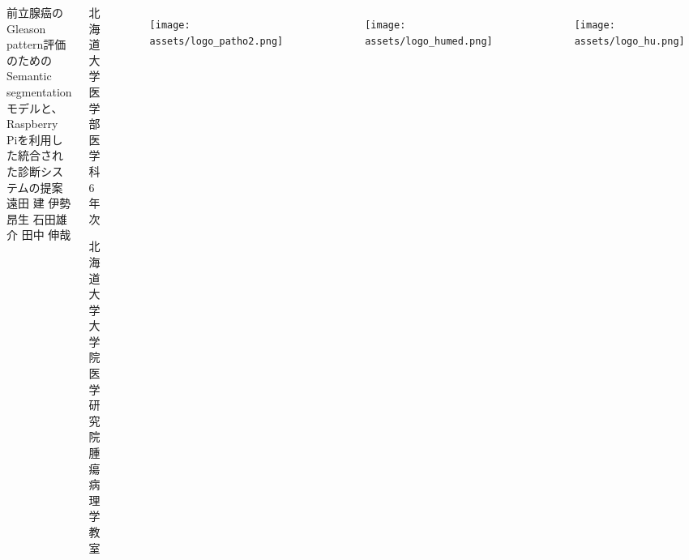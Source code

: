 \documentclass[final,dvipdfmx]{beamer}
\begin{document}
\nocite{*}

\begin{columns}[T]
  \begin{minipage}[]{0.75\columnwidth}
    \vspace{5mm}
    \huge 前立腺癌のGleason pattern評価のためのSemantic segmentationモデルと、Raspberry Piを利用した統合された診断システムの提案
    \\[5mm]
    \large 遠田 建\cite{student} \hspace{5mm} 伊勢 昂生\cite{student} \hspace{5mm} 石田雄介\cite{teacher} \hspace{5mm} 田中 伸哉\cite{teacher}
    {\small
      \begin{thebibliography}{99}
        \beamertemplatetextbibitems
        \setlength{\itemsep}{-.5zw}
        \begin{minipage}[]{0.25\columnwidth}
           北海道大学医学部医学科6年次
        \end{minipage}
        \begin{minipage}[]{0.40\columnwidth}
           北海道大学大学院医学研究院腫瘍病理学教室
        \end{minipage}
      \end{thebibliography}
    }

  \end{minipage}

  \begin{minipage}[]{0.08\columnwidth}
    \begin{figure}\centering
      \texttt{[image: assets/logo\_patho2.png]}
    \end{figure}
  \end{minipage}

  \begin{minipage}[]{0.08\columnwidth}
    \begin{figure}\centering
      \texttt{[image: assets/logo\_humed.png]}
    \end{figure}
  \end{minipage}

  \begin{minipage}[]{0.08\columnwidth}
    \begin{figure}\centering
      \texttt{[image: assets/logo\_hu.png]}
    \end{figure}
  \end{minipage}
\end{columns}
\end{document}
